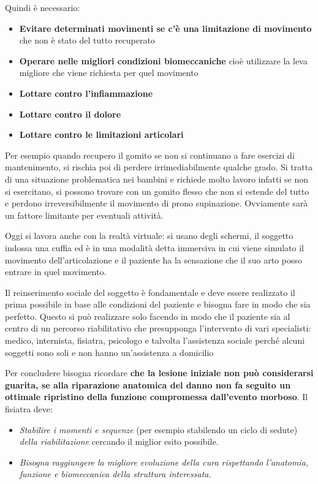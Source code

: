 \documentclass[]{article}
\begin{document}
Quindi è necessario:

\begin{itemize}
\item
  \textbf{Evitare determinati movimenti se c'è una limitazione di
  movimento} che non è stato del tutto recuperato
\item
  \textbf{Operare nelle migliori condizioni biomeccaniche} cioè
  utilizzare la leva migliore che viene richiesta per quel movimento
\item
  \textbf{Lottare contro l'infiammazione}
\item
  \textbf{Lottare contro il dolore }
\item
  \textbf{Lottare contro le limitazioni articolari}
\end{itemize}

Per esempio quando recupero il gomito se non si continuano a fare
esercizi di mantenimento, si rischia poi di perdere irrimediabilmente
qualche grado. Si tratta di una situazione problematica nei bambini e
richiede molto lavoro infatti se non si esercitano, si possono trovare
con un gomito flesso che non si estende del tutto e perdono
irreversibilmente il movimento di prono supinazione. Ovviamente sarà un
fattore limitante per eventuali attività.

Oggi si lavora anche con la realtà virtuale: si usano degli schermi, il
soggetto indossa una cuffia ed è in una modalità detta immersiva in cui
viene simulato il movimento dell'articolazione e il paziente ha la
sensazione che il suo arto posso entrare in quel movimento.

Il reinserimento sociale del soggetto è fondamentale e deve essere
realizzato il prima possibile in base alle condizioni del paziente e
bisogna fare in modo che sia perfetto. Questo si può realizzare solo
facendo in modo che il paziente sia al centro di un percorso
riabilitativo che presupponga l'intervento di vari specialisti: medico,
internista, fisiatra, psicologo e talvolta l'assistenza sociale perché
alcuni soggetti sono soli e non hanno un'assistenza a domicilio

Per concludere bisogna ricordare \textbf{che la lesione iniziale non può
considerarsi guarita, se alla riparazione anatomica del danno non fa
seguito un ottimale ripristino della funzione compromessa dall'evento
morboso}. Il fisiatra deve:

\begin{itemize}
\item
  \emph{Stabilire i momenti e sequenze} (per esempio stabilendo un ciclo
  di sedute) \emph{della riabilitazione} cercando il miglior esito
  possibile.
\item
  \emph{Bisogna raggiungere la migliore evoluzione della cura
  rispettando l'anatomia, funzione e biomeccanica della struttura
  interessata. }
\end{itemize}
\end{document}
